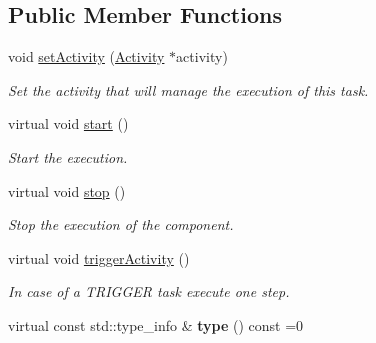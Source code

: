 \subsection*{Public Member Functions}
\begin{DoxyCompactItemize}
\item 
\hypertarget{classcoco_1_1_task_context_a66769b9863ddc426776f67905b9cbfc2}{}void \hyperlink{classcoco_1_1_task_context_a66769b9863ddc426776f67905b9cbfc2}{set\+Activity} (\hyperlink{classcoco_1_1_activity}{Activity} $\ast$activity)\label{classcoco_1_1_task_context_a66769b9863ddc426776f67905b9cbfc2}

\begin{DoxyCompactList}\small\item\em Set the activity that will manage the execution of this task. \end{DoxyCompactList}\item 
\hypertarget{classcoco_1_1_task_context_a1e631768ca31e55c4c2605320df997fc}{}virtual void \hyperlink{classcoco_1_1_task_context_a1e631768ca31e55c4c2605320df997fc}{start} ()\label{classcoco_1_1_task_context_a1e631768ca31e55c4c2605320df997fc}

\begin{DoxyCompactList}\small\item\em Start the execution. \end{DoxyCompactList}\item 
\hypertarget{classcoco_1_1_task_context_ae8fe9cb7eec3d3f57d57cd692e781785}{}virtual void \hyperlink{classcoco_1_1_task_context_ae8fe9cb7eec3d3f57d57cd692e781785}{stop} ()\label{classcoco_1_1_task_context_ae8fe9cb7eec3d3f57d57cd692e781785}

\begin{DoxyCompactList}\small\item\em Stop the execution of the component. \end{DoxyCompactList}\item 
\hypertarget{classcoco_1_1_task_context_a72a5550fc3d0ceba03f8b091852d71f6}{}virtual void \hyperlink{classcoco_1_1_task_context_a72a5550fc3d0ceba03f8b091852d71f6}{trigger\+Activity} ()\label{classcoco_1_1_task_context_a72a5550fc3d0ceba03f8b091852d71f6}

\begin{DoxyCompactList}\small\item\em In case of a T\+R\+I\+G\+G\+E\+R task execute one step. \end{DoxyCompactList}\item 
\hypertarget{classcoco_1_1_task_context_a66ec10f5b0f28a717cdc9c76110441fd}{}virtual const std\+::type\+\_\+info \& {\bfseries type} () const =0\label{classcoco_1_1_task_context_a66ec10f5b0f28a717cdc9c76110441fd}


\end{DoxyCompactItemize}
